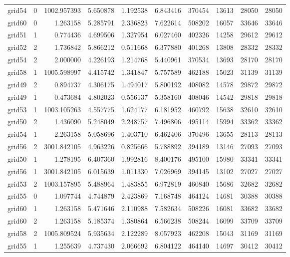 \begin{longtable}{|l|r|r|r|r|r|r|r|r|r|}
grid54 & 0 & 1002.957393 & 5.650878 & 1.192538 & 6.843416 & 370454 & 13613 & 28050 & 28050 \\
grid60 & 0 & 1.263158 & 5.285791 & 2.336823 & 7.622614 & 508202 & 16057 & 33646 & 33646 \\
grid51 & 1 & 0.774436 & 4.699506 & 1.327954 & 6.027460 & 402326 & 14258 & 29612 & 29612 \\
grid52 & 2 & 1.736842 & 5.866212 & 0.511668 & 6.377880 & 401268 & 13808 & 28332 & 28332 \\
grid54 & 2 & 2.000000 & 4.226193 & 1.214768 & 5.440961 & 370534 & 13693 & 28170 & 28170 \\
grid58 & 1 & 1005.598997 & 4.415742 & 1.341847 & 5.757589 & 462188 & 15023 & 31139 & 31139 \\
grid49 & 2 & 0.894737 & 4.306175 & 1.494017 & 5.800192 & 408082 & 14578 & 29872 & 29872 \\
grid49 & 1 & 0.473684 & 4.802023 & 0.556137 & 5.358160 & 408046 & 14542 & 29818 & 29818 \\
grid53 & 1 & 1003.105263 & 4.557775 & 1.624177 & 6.181952 & 460792 & 15638 & 32610 & 32610 \\
grid50 & 2 & 1.436090 & 5.248049 & 2.248757 & 7.496806 & 495114 & 15994 & 33362 & 33362 \\
grid54 & 1 & 2.263158 & 5.058696 & 1.403710 & 6.462406 & 370496 & 13655 & 28113 & 28113 \\
grid56 & 2 & 3001.842105 & 4.963226 & 0.825666 & 5.788892 & 394189 & 13146 & 27093 & 27093 \\
grid50 & 1 & 1.278195 & 6.407360 & 1.992816 & 8.400176 & 495100 & 15980 & 33341 & 33341 \\
grid56 & 1 & 3001.842105 & 6.015639 & 1.011330 & 7.026969 & 394145 & 13102 & 27027 & 27027 \\
grid53 & 2 & 1003.157895 & 5.488964 & 1.483855 & 6.972819 & 460840 & 15686 & 32682 & 32682 \\
grid55 & 0 & 1.097744 & 4.744879 & 2.423869 & 7.168748 & 464124 & 14681 & 30388 & 30388 \\
grid60 & 1 & 1.263158 & 5.471646 & 2.110988 & 7.582634 & 508226 & 16081 & 33682 & 33682 \\
grid60 & 2 & 1.263158 & 5.185374 & 1.380864 & 6.566238 & 508244 & 16099 & 33709 & 33709 \\
grid58 & 2 & 1005.809524 & 5.935634 & 2.122289 & 8.057923 & 462208 & 15043 & 31169 & 31169 \\
grid55 & 1 & 1.255639 & 4.737430 & 2.066692 & 6.804122 & 464140 & 14697 & 30412 & 30412 \\

\end{longtable}

